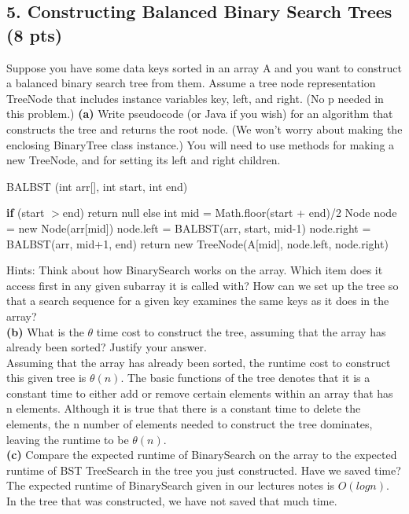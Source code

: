 \documentclass[12pt]{article}
\begin{document}
\subsection*{5. Constructing Balanced Binary Search Trees (8 pts)}
\linebreak
Suppose you have some data keys sorted in an array A and you want to construct a balanced binary search tree from them. Assume a tree node representation TreeNode that includes instance variables key, left, and right. (No p needed in this problem.) 
\linebreak
\textbf{(a)} Write pseudocode (or Java if you wish) for an algorithm that constructs the tree and returns the root node. (We won't worry about making the enclosing BinaryTree class instance.) You will need to use methods for making a new TreeNode, and for setting its left and right children. \\
\linebreak
\begin{algorithm}[H]
\caption{BALBST (int arr[], int start, int end)}
\begin{algorithmic}[H]
\State \textbf{if} (start $>$end) 
\State \qquad return null
\State else 
\State int mid = Math.floor(start + end)/2
\State Node node = new Node(arr[mid])
\State node.left = BALBST(arr, start, mid-1)
\State node.right = BALBST(arr, mid+1, end)
\State return new TreeNode(A[mid], node.left, node.right)
\end{algorithmic}
\end{algorithm}
\linebreak
Hints: Think about how BinarySearch works on the array. Which item does it access first in any given subarray it is called with? How can we set up the tree so that a search sequence for a given key examines the same keys as it does in the array? \\
\linebreak
\textbf{(b)} What is the $\theta$ time cost to construct the tree, assuming that the array has already been sorted? Justify your answer. \\
\linebreak
Assuming that the array has already been sorted, the runtime cost to construct this given tree is $\theta(n)$. The  basic functions of the tree denotes that it is a constant time to either add or remove certain elements within an array that has n elements. Although it is true that there is a constant time to delete the elements, the n number of elements needed to construct the tree dominates, leaving the runtime to be $\theta(n)$. \\
\linebreak
\textbf{(c)} Compare the expected runtime of BinarySearch on the array to the expected runtime of BST TreeSearch in the tree you just constructed. Have we saved time? \\
The expected runtime of BinarySearch given in our lectures notes is $O(log n)$.  In the tree that was constructed, we have not saved that much time. \\
\end{document}
